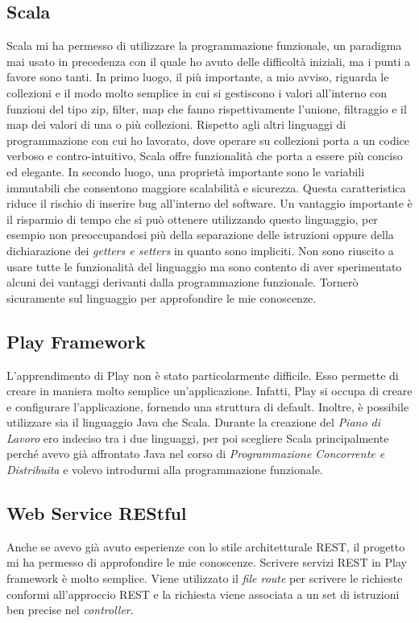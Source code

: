 	\subsection*{Scala}  
	Scala mi ha permesso di utilizzare la programmazione funzionale, un paradigma mai usato in precedenza con il quale ho avuto delle difficoltà iniziali, ma i punti a favore sono tanti. In primo luogo, il più importante, a mio avviso, riguarda le collezioni e il modo molto semplice in cui si gestiscono i valori all'interno con funzioni del tipo zip, filter, map che fanno rispettivamente l'unione, filtraggio e il map dei valori di una o più collezioni. Rispetto agli altri linguaggi di programmazione con cui ho lavorato, dove operare su collezioni porta a un codice verboso e contro-intuitivo, Scala offre funzionalità che porta a essere più conciso ed elegante. In secondo luogo, una proprietà importante sono le variabili immutabili che consentono maggiore scalabilità e sicurezza. Questa caratteristica riduce il rischio di inserire bug all'interno del software. Un vantaggio importante è il risparmio di tempo che si può ottenere utilizzando questo linguaggio, per esempio non preoccupandosi più della separazione delle istruzioni oppure della dichiarazione dei \textit{getters e setters} in quanto sono impliciti. Non sono riuscito a usare tutte le funzionalità del linguaggio ma sono contento di aver sperimentato alcuni dei vantaggi derivanti dalla programmazione funzionale. Tornerò sicuramente sul linguaggio per approfondire le mie conoscenze.
	
	\subsection*{Play Framework}
	L'apprendimento di Play non è stato particolarmente difficile. Esso permette di creare in maniera molto semplice un'applicazione. Infatti, Play si occupa di creare e configurare l'applicazione, fornendo una struttura di default. Inoltre, è possibile utilizzare sia il linguaggio Java che Scala. Durante la creazione del \textit{Piano di Lavoro} ero indeciso tra i due linguaggi, per poi scegliere Scala principalmente perché avevo già affrontato Java nel corso di \textit{Programmazione Concorrente e Distribuita} e volevo introdurmi alla programmazione funzionale.
	
	\subsection*{Web Service REStful}
	 Anche se avevo già avuto esperienze con lo stile architetturale \gls{REST}, il progetto mi ha permesso di approfondire le mie conoscenze. Scrivere servizi \gls{REST} in Play framework è molto semplice. Viene utilizzato il \textit{file route} per scrivere le richieste conformi all'approccio \gls{REST} e la richiesta viene associata a un set di istruzioni ben precise nel \textit{controller}.\\ 
	 
